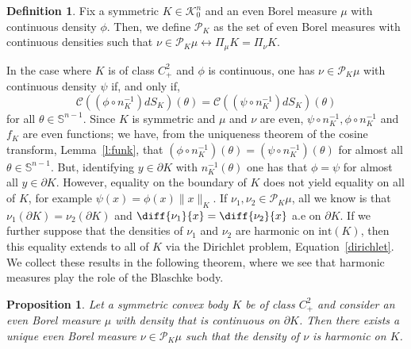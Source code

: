 \documentclass[11pt]{amsart}
\newtheorem{proposition}[theorem]{Proposition}
\theoremstyle{definition}
\newtheorem{definition}[theorem]{Definition}
\theoremstyle{remark}
\numberwithin{equation}{section}
\newcommand{\s}{\mathbb{S}}
\newcommand{\conbod}{\mathcal{K}^n}
\newcommand{\ct}[2]{\mathcal{C}({#1})({#2})}
\begin{document}
\begin{definition}
Fix a symmetric $K\in\conbod_0$ and an even Borel measure $\mu$ with continuous density $\phi$. Then, we define $\mathcal{P}_{K}$ as the set of even Borel measures with continuous densities such that $\nu\in \mathcal{P}_{K} \mu \leftrightarrow \Pi_{\mu} K = \Pi_{\nu}K.$ 
\end{definition}
In the case where $K$ is of class $C^2_+$ and $\phi$ is continuous, one has $\nu\in \mathcal{P}_{K} \mu$ with continuous density $\psi$ if, and only if, $$\ct{\left(\phi\circ n^{-1}_K\right)dS_K}{\theta}=\ct{\left(\psi\circ n^{-1}_K\right)dS_K}{\theta}$$
for all $\theta\in\s^{n-1}.$ Since $K$ is symmetric and $\mu$ and $\nu$ are even, $\psi\circ n^{-1}_K, \phi\circ n^{-1}_K$  and $f_K$ are even functions; we have, from the uniqueness theorem of the cosine transform, Lemma~\ref{l:funk}, that $(\phi\circ n^{-1}_K)(\theta)=(\psi\circ n^{-1}_K)(\theta)$ for almost all $\theta\in\s^{n-1}$. But, identifying $y\in\partial K$ with $n^{-1}_K(\theta)$ one has that $\phi=\psi$ for almost all $y\in\partial K.$ However, equality on the boundary of $K$ does not yield equality on all of $K$, for example $\psi(x)=\phi(x)\|x\|_K.$ If $\nu_1,\nu_2\in \mathcal{P}_{K} \mu$, all we know is that $\nu_1(\partial K)=\nu_2(\partial K)$ and $\diff{\nu_1}{x}=\diff{\nu_2}{x}$ a.e on $\partial K$. If we further suppose that the densities of $\nu_1$ and $\nu_2$ are harmonic on $\text{int}(K)$, then this equality extends to all of $K$ via the Dirichlet problem, Equation~\ref{dirichlet}. We collect these results in the following theorem, where we see that harmonic measures play the role of the Blaschke body.
\begin{proposition}
Let a symmetric convex body $K$ be of class $C^2_+$ and consider an even Borel measure $\mu$ with density that is continuous on $\partial K$. Then there exists a unique even Borel measure $\nu\in \mathcal{P}_{K} \mu$ such that the density of $\nu$ is harmonic on $K$.
\end{proposition}
\end{document}
